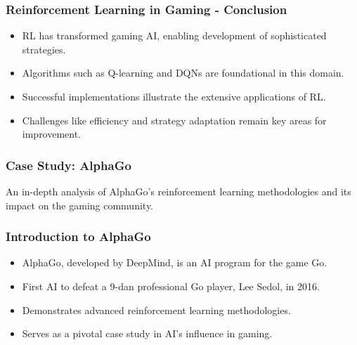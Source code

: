 \documentclass[aspectratio=169]{beamer}
\begin{document}
\begin{frame}[fragile]
    \frametitle{Reinforcement Learning in Gaming - Conclusion}
    \begin{itemize}
        \item RL has transformed gaming AI, enabling development of sophisticated strategies.
        \item Algorithms such as Q-learning and DQNs are foundational in this domain.
        \item Successful implementations illustrate the extensive applications of RL.
        \item Challenges like efficiency and strategy adaptation remain key areas for improvement.
    \end{itemize}
\end{frame}

\begin{frame}[fragile]
  \frametitle{Case Study: AlphaGo}
  An in-depth analysis of AlphaGo’s reinforcement learning methodologies and its impact on the gaming community.
\end{frame}

\begin{frame}[fragile]
  \frametitle{Introduction to AlphaGo}
  \begin{itemize}
    \item AlphaGo, developed by DeepMind, is an AI program for the game Go.
    \item First AI to defeat a 9-dan professional Go player, Lee Sedol, in 2016.
    \item Demonstrates advanced reinforcement learning methodologies.
    \item Serves as a pivotal case study in AI's influence in gaming.
  \end{itemize}
\end{frame}
\end{document}
